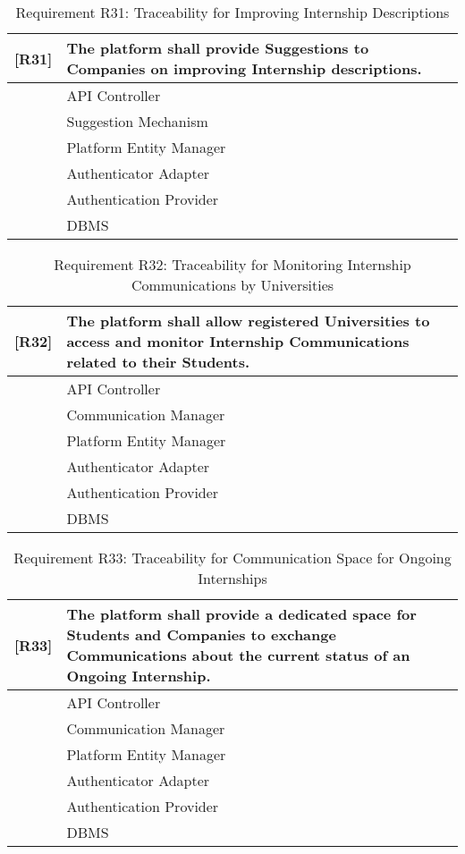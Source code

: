 \begin{table}[H]
    \centering
    \begin{tabular}{|p{1cm}|p{14cm}|}
    \hline
    \textbf{[R31]} & \textbf{The platform shall provide Suggestions to Companies on improving Internship descriptions.} \\ \hline
    [C1] & API Controller \\ \hline
    [C9] & Suggestion Mechanism \\ \hline
    [C10] & Platform Entity Manager \\ \hline
    [C11] & Authenticator Adapter \\ \hline
    [E3] & Authentication Provider \\ \hline
    [E4] & DBMS \\ \hline
    \end{tabular}
    \caption{Requirement R31: Traceability for Improving Internship Descriptions}
    \label{tab:RT31}
\end{table}

\begin{table}[H]
    \centering
    \begin{tabular}{|p{1cm}|p{14cm}|}
    \hline
    \textbf{[R32]} & \textbf{The platform shall allow registered Universities to access and monitor Internship Communications related to their Students.} \\ \hline
    [C1] & API Controller \\ \hline
    [C7] & Communication Manager \\ \hline
    [C10] & Platform Entity Manager \\ \hline
    [C11] & Authenticator Adapter \\ \hline
    [E3] & Authentication Provider \\ \hline
    [E4] & DBMS \\ \hline
    \end{tabular}
    \caption{Requirement R32: Traceability for Monitoring Internship Communications by Universities}
    \label{tab:RT32}
\end{table}

\begin{table}[H]
    \centering
    \begin{tabular}{|p{1cm}|p{14cm}|}
    \hline
    \textbf{[R33]} & \textbf{The platform shall provide a dedicated space for Students and Companies to exchange Communications about the current status of an Ongoing Internship.} \\ \hline
    [C1] & API Controller \\ \hline
    [C7] & Communication Manager \\ \hline
    [C10] & Platform Entity Manager \\ \hline
    [C11] & Authenticator Adapter \\ \hline
    [E3] & Authentication Provider \\ \hline
    [E4] & DBMS \\ \hline
    \end{tabular}
    \caption{Requirement R33: Traceability for Communication Space for Ongoing Internships}
    \label{tab:RT33}
\end{table}

